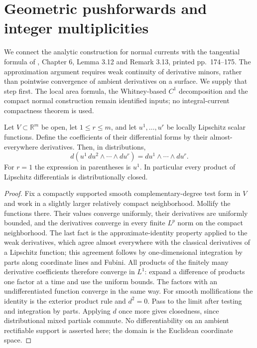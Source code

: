 \chapter{Geometric pushforwards and integer multiplicities}\label{sec:geometric-integer-pushforward}
We connect the analytic construction for normal currents with the tangential formula of \cite{Sim18}, Chapter 6, Lemma 3.12 and Remark 3.13, printed pp.~174--175. The approximation argument requires weak continuity of derivative minors, rather than pointwise convergence of ambient derivatives on a surface. We supply that step first. The local area formula, the Whitney-based $C^1$ decomposition and the compact normal construction remain identified inputs; no integral-current compactness theorem is used.

\begin{lemma}\label{lem:lipschitz-differential-wedge-identity}
Let $V\subset\mathbb R^m$ be open, let $1\leq r\leq m$, and let $u^1,\ldots,u^r$ be locally Lipschitz scalar functions. Define the coefficients of their differential forms by their almost-everywhere derivatives. Then, in distributions,
\[
 d(u^1\,du^2\wedge\cdots\wedge du^r)
 =du^1\wedge\cdots\wedge du^r.
\]
For $r=1$ the expression in parentheses is $u^1$. In particular every product of Lipschitz differentials is distributionally closed.
\end{lemma}
\begin{proof}
Fix a compactly supported smooth complementary-degree test form in $V$ and work in a slightly larger relatively compact neighborhood. Mollify the functions there. Their values converge uniformly, their derivatives are uniformly bounded, and the derivatives converge in every finite $L^p$ norm on the compact neighborhood. The last fact is the approximate-identity property applied to the weak derivatives, which agree almost everywhere with the classical derivatives of a Lipschitz function; this agreement follows by one-dimensional integration by parts along coordinate lines and Fubini. All products of the finitely many derivative coefficients therefore converge in $L^1$: expand a difference of products one factor at a time and use the uniform bounds. The factors with an undifferentiated function converge in the same way. For smooth mollifications the identity is the exterior product rule and $d^2=0$. Pass to the limit after testing and integration by parts. Applying $d$ once more gives closedness, since distributional mixed partials commute. No differentiability on an ambient rectifiable support is asserted here; the domain is the Euclidean coordinate space.
\end{proof}

